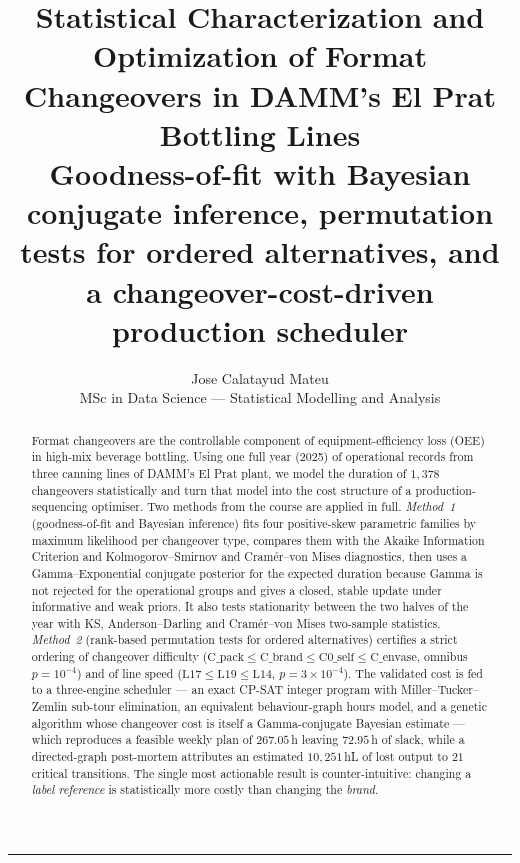 \documentclass[11pt,a4paper]{article}
\title{\vspace{-1.3cm}\textbf{Statistical Characterization and Optimization of
Format Changeovers in DAMM's El Prat Bottling Lines}\\[3pt]
\large Goodness-of-fit with Bayesian conjugate inference, permutation tests for
ordered alternatives, and a changeover-cost-driven production scheduler}
\author{Jose Calatayud Mateu \\[2pt]
\small MSc in Data Science --- Statistical Modelling and Analysis}
\date{}
\begin{document}
\maketitle
\vspace{-0.8cm}

\begin{abstract}
\noindent
Format changeovers are the controllable component of equipment-efficiency loss
(OEE) in high-mix beverage bottling. Using one full year (2025) of operational
records from three canning lines of DAMM's El Prat plant, we model the duration
of $1{,}378$ changeovers statistically and turn that model into the cost
structure of a production-sequencing optimiser. Two methods from the course are
applied in full. \emph{Method~1} (goodness-of-fit and Bayesian inference) fits
four positive-skew parametric families by maximum likelihood per changeover
type, compares them with the Akaike Information Criterion and
Kolmogorov--Smirnov and Cram\'er--von Mises diagnostics, then uses a
Gamma--Exponential conjugate posterior for the expected duration because Gamma is
not rejected for the operational groups and gives a closed, stable update under
informative and weak priors. It also tests
stationarity between the two halves of the year with KS, Anderson--Darling and
Cram\'er--von Mises two-sample statistics. \emph{Method~2} (rank-based
permutation tests for ordered alternatives) certifies a strict ordering of
changeover difficulty
($\text{C\_pack}\!\le\!\text{C\_brand}\!\le\!\text{C0\_self}\!\le\!\text{C\_envase}$,
omnibus $p=10^{-4}$) and of line speed
($\text{L17}\!\le\!\text{L19}\!\le\!\text{L14}$, $p=3\times10^{-4}$). The validated
cost is fed to a three-engine scheduler --- an exact CP-SAT integer program with
Miller--Tucker--Zemlin sub-tour elimination, an equivalent behaviour-graph hours
model, and a genetic algorithm whose changeover cost is itself a Gamma-conjugate
Bayesian estimate --- which reproduces a feasible weekly plan of $267.05$\,h
leaving $72.95$\,h of slack, while a directed-graph post-mortem attributes an
estimated $10{,}251$\,hL of lost output to $21$ critical transitions. The single
most actionable result is counter-intuitive: changing a \emph{label reference}
is statistically more costly than changing the \emph{brand}.
\end{abstract}

\tableofcontents
\vspace{0.2cm}
\hrule

\end{document}
